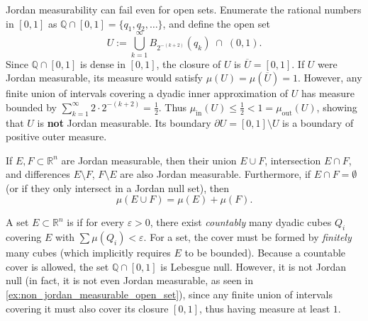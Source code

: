 \begin{example}
\label{ex:non_jordan_measurable_open_set}
Jordan measurability can fail even for open sets. Enumerate the rational numbers in $[0,1]$ as $\mathbb{Q} \cap [0,1] = \{q_1, q_2, \dots\}$, and define the open set
\[
U := \bigcup_{k=1}^\infty B_{2^{-(k+2)}}(q_k) \;\cap\; (0,1).
\]
Since $\mathbb{Q} \cap [0,1]$ is dense in $[0,1]$, the closure of $U$ is $\overline{U} = [0,1]$. If $U$ were Jordan measurable, its measure would satisfy $\mu(U) = \mu(\overline{U}) = 1$. However, any finite union of intervals covering a dyadic inner approximation of $U$ has measure bounded by $\sum_{k=1}^\infty 2 \cdot 2^{-(k+2)} = \frac{1}{2}$. Thus $\mu_{\mathrm{in}}(U) \leq \frac{1}{2} < 1 = \mu_{\mathrm{out}}(U)$, showing that $U$ is \textbf{not} Jordan measurable. Its boundary $\partial U = [0,1] \setminus U$ is a  boundary of positive outer measure.
\end{example}

\begin{proposition}
\label{prop:algebra_jordan_measurable}
If $E, F \subset \mathbb{R}^n$ are Jordan measurable, then their union $E \cup F$, intersection $E \cap F$, and differences $E \setminus F$, $F \setminus E$ are also Jordan measurable.
Furthermore, if $E \cap F = \emptyset$ (or if they only intersect in a Jordan null set), then
\[
\mu(E \cup F) = \mu(E) + \mu(F).
\]
\end{proposition}

\begin{remark}
\label{rem:lebesgue_vs_jordan_null}
A set $E \subset \mathbb{R}^n$ is  if for every $\varepsilon > 0$, there exist \emph{countably} many dyadic cubes $Q_i$ covering $E$ with $\sum \mu(Q_i) < \varepsilon$. For a  set, the cover must be formed by \emph{finitely} many cubes (which implicitly requires $E$ to be bounded).
Because a countable cover is allowed, the set $\mathbb{Q} \cap [0,1]$ is Lebesgue null. However, it is not Jordan null (in fact, it is not even Jordan measurable, as seen in \cref{ex:non_jordan_measurable_open_set}), since any finite union of intervals covering it must also cover its closure $[0,1]$, thus having measure at least $1$.
\end{remark}

